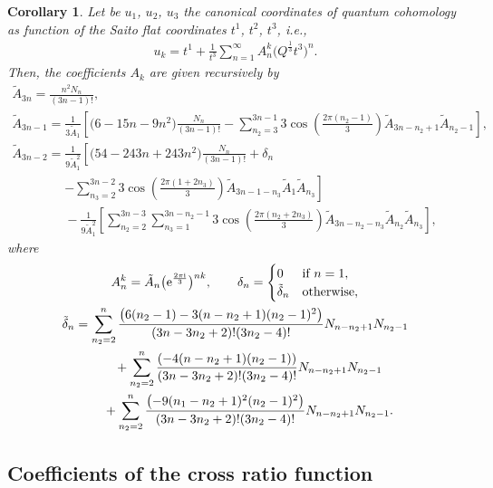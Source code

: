 \documentclass[pdftex]{sigma}
\numberwithin{equation}{section}
\newtheorem{Corollary}[Theorem]{Corollary}
\begin{document}
\begin{Corollary}
Let be $u_1$, $u_2$, $u_3$ the canonical coordinates of quantum cohomology as function of the Saito flat coordinates $t^1$, $t^2$, $t^3$, i.e.,
\begin{gather*}%
u_k=t^1+\frac{1}{t^3}\sum_{n=1}^{\infty} A_n^k \bigl( Q^{\frac{1}{3}}t^3 \bigr)^n.
\end{gather*}
Then, the coefficients $A_{k}$ are given recursively by
\begin{gather*}
\tilde A_{3n}=\frac{n^2N_n}{(3n-1)! },\\
 \tilde A_{3n-1}=\frac{1}{3 \tilde A_{1}}\left[\bigl(6-15n-9n^2 \bigr)\frac{N_n}{(3n-1)!}-\sum_{n_2=3}^{3n-1}3\cos\left( \frac{2\pi (n_2-1)}{3}\right) \tilde A_{3n-n_2+1} \tilde A_{n_2-1}\right],\\
 \tilde A_{3n-2}=\frac{1}{9\tilde A_1^2}\left[\bigl(54-243n +243n^2\bigr)\frac{N_n}{(3n-1)!}+\delta_{n} \right.\\
 \phantom{ \tilde A_{3n-2}=}{}\left.-\sum_{n_3=2}^{3n-2}3\cos\left( \frac{2\pi (1+2n_3 )}{3} \right) \tilde A_{3n-1-n_3} \tilde A_{1} \tilde A_{n_3}\right]\\
\phantom{ \tilde A_{3n-2}=}{}-\frac{1}{9\tilde A_1^2}\left[\sum_{n_2=2}^{3n-3}\sum_{n_3=1}^{3n-n_2-1}3\cos\left( \frac{2\pi (n_2+2n_3 )}{3} \right) \tilde A_{3n-n_2-n_3} \tilde A_{n_2} \tilde A_{n_3}\right],
\end{gather*}
where
\begin{gather*}
A_n^k=\tilde A_n \bigl( {\rm e}^{\frac{2\pi {\rm i}}{3}}\bigr)^{nk}
,\qquad
\delta_n=
\begin{cases}
0& \text{if } n=1,\\
 \tilde\delta_n & \text{otherwise},
\end{cases}
\\
\tilde\delta_n=\sum_{n_2=2}^{n}\frac{\bigl(6(n_2-1)-3(n-n_2+1)(n_2-1)^2 \bigr)}{(3n-3n_2+2)!(3n_2-4)!} N_{n-n_2+1}N_{n_2-1}\\
\phantom{\tilde\delta_n=}{}+\sum_{n_2=2}^{n}\frac{(-4(n-n_2+1)(n_2-1) )}{(3n-3n_2+2)!(3n_2-4)!} N_{n-n_2+1}N_{n_2-1}\\
\phantom{\tilde\delta_n=}{}+\sum_{n_2=2}^{n}\frac{\bigl(-9(n_1-n_2+1)^2(n_2-1)^2 \bigr)}{(3n-3n_2+2)!(3n_2-4)!} N_{n-n_2+1}N_{n_2-1}.
\end{gather*}
\end{Corollary}

\subsection{Coefficients of the cross ratio function}\label{Coefficients of the cross ratio function}
\end{document}
